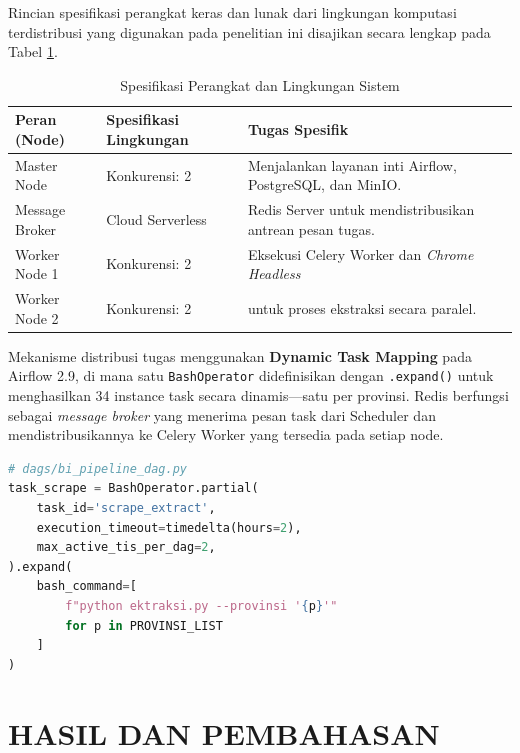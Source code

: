 \documentclass[10pt, a4paper, twocolumn]{article}
\begin{document}
Rincian spesifikasi perangkat keras dan lunak dari lingkungan komputasi terdistribusi yang digunakan pada penelitian ini disajikan secara lengkap pada Tabel \ref{tab:env_setup}.

\begin{table}[H]
\centering
\caption{Spesifikasi Perangkat dan Lingkungan Sistem}
\label{tab:env_setup}
\fontsize{8}{10}\selectfont
\begin{tabularx}{\linewidth}{|>{\raggedright\arraybackslash}X|>{\raggedright\arraybackslash}X|>{\raggedright\arraybackslash}X|}
\hline
\textbf{Peran (Node)} & \textbf{Spesifikasi Lingkungan} & \textbf{Tugas Spesifik} \\
\hline
Master Node & Konkurensi: 2 & Menjalankan layanan inti Airflow, PostgreSQL, dan MinIO. \\
\hline
Message Broker & Cloud Serverless & Redis Server untuk mendistribusikan antrean pesan tugas. \\
\hline
Worker Node 1 & Konkurensi: 2 & Eksekusi Celery Worker dan \textit{Chrome Headless} \\
\cline{1-2}
Worker Node 2 & Konkurensi: 2 & untuk proses ekstraksi secara paralel. \\
\hline
\end{tabularx}
\end{table}

\noindent Mekanisme distribusi tugas menggunakan \textbf{Dynamic Task Mapping} pada Airflow 2.9, di mana satu \texttt{BashOperator} didefinisikan dengan \texttt{.expand()} untuk menghasilkan 34 instance task secara dinamis—satu per provinsi. Redis berfungsi sebagai \textit{message broker} yang menerima pesan task dari Scheduler dan mendistribusikannya ke Celery Worker yang tersedia pada setiap node.

\begin{lstlisting}[language=Python, caption={Implementasi Dynamic Task Mapping}]
# dags/bi_pipeline_dag.py
task_scrape = BashOperator.partial(
    task_id='scrape_extract',
    execution_timeout=timedelta(hours=2),
    max_active_tis_per_dag=2,
).expand(
    bash_command=[
        f"python ektraksi.py --provinsi '{p}'"
        for p in PROVINSI_LIST
    ]
)
\end{lstlisting}

\section{HASIL DAN PEMBAHASAN}
\end{document}
